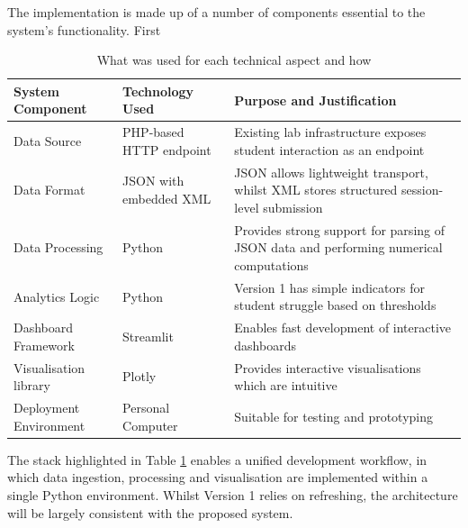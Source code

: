The implementation is made up of a number of components essential to the system's functionality. First


\begin{table}[H]
    \centering
    \begin{tabular}{|p{3.5cm}|p{3.5cm}|p{6cm}|}
    \hline
   System Component & Technology Used & Purpose and Justification \\
    \hline
    \hline
    Data Source& PHP-based HTTP endpoint & Existing lab infrastructure exposes student interaction as an endpoint\\
    \hline
    Data Format& JSON with embedded XML & JSON allows lightweight transport, whilst XML stores structured session-level submission\\
    \hline
    Data Processing& Python & Provides strong support for parsing of JSON data and performing numerical computations\\
    \hline
    Analytics Logic& Python & Version 1 has simple indicators for student struggle based on thresholds\\
    \hline
    Dashboard Framework& Streamlit & Enables fast development of interactive dashboards\\
    \hline
    Visualisation library& Plotly & Provides interactive visualisations which are intuitive\\
    \hline
    Deployment Environment& Personal Computer & Suitable for testing and prototyping\\
    \hline
    \end{tabular}
    \caption{What was used for each technical aspect and how}
    \label{tab: selection table}
\end{table}

The stack highlighted in Table \ref{tab: selection table} enables a unified development workflow, in which data ingestion, processing and visualisation are implemented within a single Python environment. Whilst Version 1 relies on refreshing, the architecture will be largely consistent with the proposed system.


